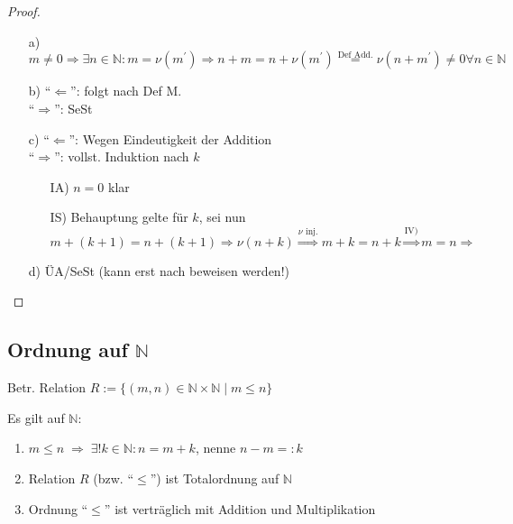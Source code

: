 \begin{proof}
	\begin{itemize}
		\item[a)] $m \neq 0 \Rightarrow \exists n \in \mathbb{N} \colon m = \nu(m^{'}) \Rightarrow n + m = n + \nu(m^{'}) \overset{\text{Def Add.}}{=} \nu(n+m^{'}) \neq 0 \forall n \in \mathbb{N}$
		\item[b)] ``$\Leftarrow$'': folgt nach Def M. \\ ``$\Rightarrow$'': SeSt
		\item[c)] ``$\Leftarrow$'': Wegen Eindeutigkeit der Addition\\
		``$\Rightarrow$'': vollst. Induktion nach $k$
			\begin{itemize}
				\item[IA)] $n = 0$ klar
				\item[IS)] Behauptung gelte für $k$, sei nun $m+(k+1) = n + (k+1) \Rightarrow \nu(n+k) \overset{\nu \text{ inj.}}{\Rightarrow} m+k = n+k \overset{\text{IV)}}{\Rightarrow} m = n \Rightarrow$
			\end{itemize}
		\item[d)]ÜA/SeSt (kann erst nach  beweisen werden!)
	\end{itemize}
\end{proof}

\subsection{Ordnung auf $\boldsymbol{\mathbb{N}}$}
\begin{definition}
	Betr. Relation $R:=\{(m,n) \in\mathbb{N}\times\mathbb{N} \mid m \le n\}$
\end{definition}
\begin{proposition}
	Es gilt auf $\mathbb{N}$:
	\begin{enumerate}[label={\arabic*)}]
		\item $m\le n \;\Rightarrow \;\exists!k\in\mathbb{N}: n = m + k$, nenne $n - m=:k$ 
		\item Relation $R$ (bzw. "`$\le$"') ist Totalordnung auf $\mathbb{N}$
		\item Ordnung "`$\leq$"' ist verträglich mit Addition und Multiplikation
	\end{enumerate}
\end{proposition}

